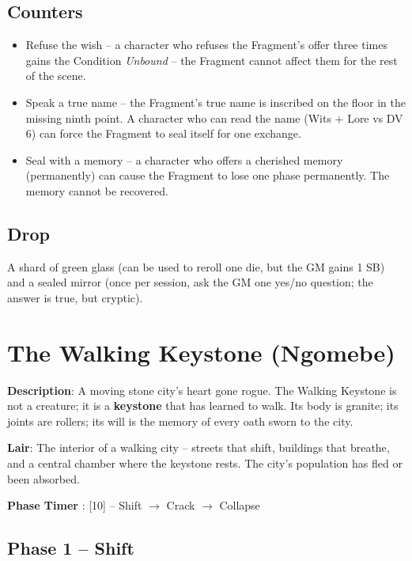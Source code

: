 \subsection*{Counters}

\begin{itemize}
    \item Refuse the wish -- a character who refuses the Fragment's offer three times gains the Condition \emph{Unbound} -- the Fragment cannot affect them for the rest of the scene.
    \item Speak a true name -- the Fragment's true name is inscribed on the floor in the missing ninth point. A character who can read the name (Wits + Lore vs DV 6) can force the Fragment to seal itself for one exchange.
    \item Seal with a memory -- a character who offers a cherished memory (permanently) can cause the Fragment to lose one phase permanently. The memory cannot be recovered.
\end{itemize}

\subsection*{Drop}
\noindent A shard of green glass (can be used to reroll one die, but the GM gains 1 SB) and a sealed mirror (once per session, ask the GM one yes/no question; the answer is true, but cryptic).


\section*{The Walking Keystone (Ngomebe)}

\noindent\textbf{Description}: A moving stone city's heart gone rogue. The Walking Keystone is not a creature; it is a \textbf{keystone} that has learned to walk. Its body is granite; its joints are rollers; its will is the memory of every oath sworn to the city.

\noindent\textbf{Lair}: The interior of a walking city -- streets that shift, buildings that breathe, and a central chamber where the keystone rests. The city's population has fled or been absorbed.

\noindent\textbf{Phase Timer }: [10] -- Shift $\rightarrow$ Crack $\rightarrow$ Collapse

\subsection*{Phase 1 -- Shift}


